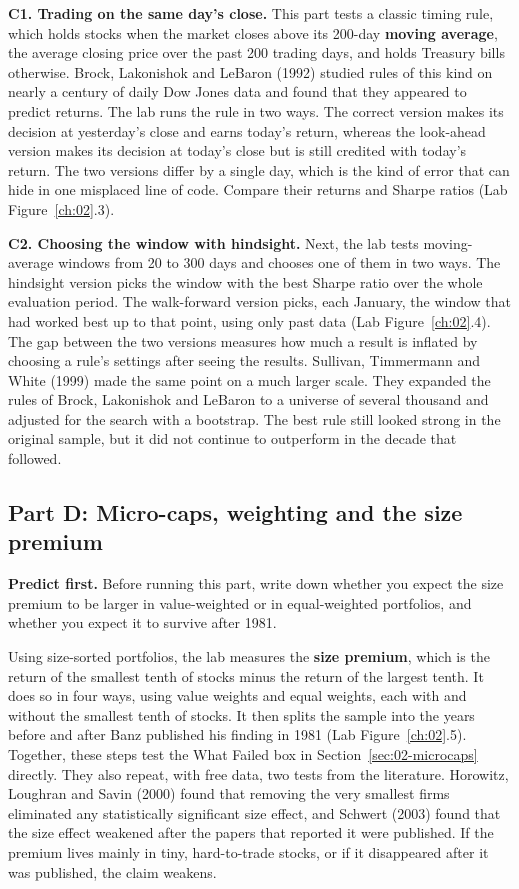 \textbf{C1. Trading on the same day's close.} This part tests a classic timing rule, which holds stocks when the market closes above its 200-day \textbf{moving average}, the average closing price over the past 200 trading days, and holds Treasury bills otherwise. Brock, Lakonishok and LeBaron (1992) studied rules of this kind on nearly a century of daily Dow Jones data and found that they appeared to predict returns. The lab runs the rule in two ways. The correct version makes its decision at yesterday's close and earns today's return, whereas the look-ahead version makes its decision at today's close but is still credited with today's return. The two versions differ by a single day, which is the kind of error that can hide in one misplaced line of code. Compare their returns and Sharpe ratios (Lab Figure~\ref{ch:02}.3).

\textbf{C2. Choosing the window with hindsight.} Next, the lab tests moving-average windows from 20 to 300 days and chooses one of them in two ways. The hindsight version picks the window with the best Sharpe ratio over the whole evaluation period. The walk-forward version picks, each January, the window that had worked best up to that point, using only past data (Lab Figure~\ref{ch:02}.4). The gap between the two versions measures how much a result is inflated by choosing a rule's settings after seeing the results. Sullivan, Timmermann and White (1999) made the same point on a much larger scale. They expanded the rules of Brock, Lakonishok and LeBaron to a universe of several thousand and adjusted for the search with a bootstrap. The best rule still looked strong in the original sample, but it did not continue to outperform in the decade that followed.

\subsection*{Part D: Micro-caps, weighting and the size premium}

\textbf{Predict first.} Before running this part, write down whether you expect the size premium to be larger in value-weighted or in equal-weighted portfolios, and whether you expect it to survive after 1981.

Using size-sorted portfolios, the lab measures the \textbf{size premium}, which is the return of the smallest tenth of stocks minus the return of the largest tenth. It does so in four ways, using value weights and equal weights, each with and without the smallest tenth of stocks. It then splits the sample into the years before and after Banz published his finding in 1981 (Lab Figure~\ref{ch:02}.5). Together, these steps test the What Failed box in Section~\ref{sec:02-microcaps} directly. They also repeat, with free data, two tests from the literature. Horowitz, Loughran and Savin (2000) found that removing the very smallest firms eliminated any statistically significant size effect, and Schwert (2003) found that the size effect weakened after the papers that reported it were published. If the premium lives mainly in tiny, hard-to-trade stocks, or if it disappeared after it was published, the claim weakens.

